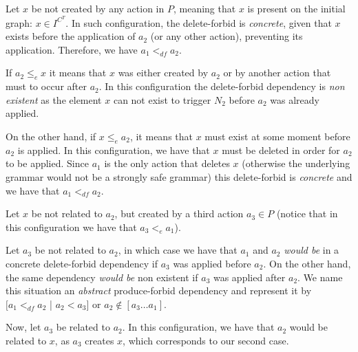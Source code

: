 \begin{description}[style=nextline,leftmargin=*]

  \item [Triggering element is present on the initial graph:]
Let $x$ be not created by any action in $P$, meaning that $x$ is present on the initial graph: $x \in I^{C^T}$. In such configuration, the delete-forbid is \emph{concrete}, given that $x$ exists before the application of $a_2$ (or any other action), preventing its application. Therefore, we have $a_1 <_{df} a_2$.

  \item [Triggering element is related to the action:] If $a_2 \leq_e x$ it means that $x$ was either created by $a_2$ or by another action that must to occur after $a_2$. In this configuration the delete-forbid dependency is \emph{non existent} as the element $x$ can not exist to trigger $N_2$ before $a_2$ was already applied.

    On the other hand, if $x \leq_e a_2$, it means that $x$ must exist at some moment before $a_2$ is applied. In this configuration, we have that $x$ must be deleted in order for $a_2$ to be applied. Since $a_1$ is the only action that deletes $x$ (otherwise the underlying grammar would not be a strongly safe grammar) this delete-forbid is \emph{concrete} and we have that $a_1 <_{df} a_2$.

\item [Triggering element is not related to the action:]
  Let $x$ be not related to $a_2$, but created by a third action $a_3 \in P$ (notice that in this configuration we have that $a_3 <_{e} a_1$).

    Let $a_3$ be not related to $a_2$, in which case we have that $a_1$ and $a_2$ \emph{would be} in a concrete delete-forbid dependency if $a_3$ was applied before $a_2$. On the other hand, the same dependency \emph{would be} non existent if $a_3$ was applied after $a_2$. We name this situation an \emph{abstract} produce-forbid dependency and represent it by $[a_1 <_{df} a_2$ | $a_2 < a_3]$ or $a_2 \not\in [a_3 \ldots a_1]$.


Now, let $a_3$ be related to $a_2$. In this configuration, we have that $a_2$ would be related to $x$, as $a_3$ creates $x$, which corresponds to our second case.
\end{description}


